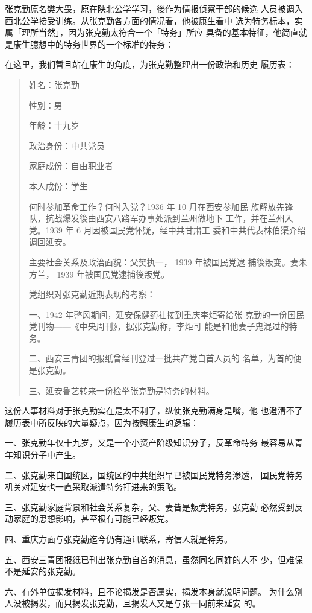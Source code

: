张克勤原名樊大畏，原在陕北公学学习，後作为情报侦察干部的候选
人员被调入西北公学接受训练。从张克勤各方面的情况看，他被康生看中
选为特务标本，实属「理所当然」，因为张克勤太符合一个「特务」所应
具备的基本特征，他简直就是康生臆想中的特务世界的一个标准的特务：
 
在这里，我们暂且站在康生的角度，为张克勤整理出一份政治和历史
履历表：
\begin{quote}
	
{\fzwkai 姓名：张克勤

性别：男

年龄：十九岁

政治身份：中共党员


家庭成份：自由职业者

本人成份：学生

何时参加革命工作？何时入党？1936 年 10 月在西安参加民
族解放先锋队，抗战爆发後由西安八路军办事处派到兰州做地下
工作，并在兰州入党。1939 年 6 月因被国民党怀疑，经中共甘肃工
委和中共代表林伯渠介绍调回延安。

主要社会关系及政治面貌：父樊执一， 1939 年被国民党逮
捕後叛变。妻朱方兰， 1939 年被国民党逮捕後叛党。

党组织对张克勤近期表现的考察：

一、1942 年整风期间，延安保健药社接到重庆李炬寄给张
克勤的一份国民党刊物——《中央周刊》，据张克勤称，李炬可
能是和他妻子鬼混过的特务。

二、西安三青团的报纸曾经刊登过一批共产党自首人员的
名单，为首的便是张克勤。

三、延安鲁艺转来一份检举张克勤是特务的材料。}
\end{quote}

这份人事材料对于张克勤实在是太不利了，纵使张克勤满身是嘴，他
也澄清不了履历表中所反映的大量疑点，因为按照康生的逻辑：

一、张克勤年仅十九岁，又是一个小资产阶级知识分子，反革命特务
最容易从青年知识分子中产生。

二、张克勤来自国统区，国统区的中共组织早已被国民党特务渗透，
国民党特务机关对延安也一直采取派遣特务打进来的策略。

三、张克勤家庭背景和社会关系复杂，父、妻皆是叛党特务，张克勤
必然受到反动家庭的思想影响，甚至极有可能已经叛党。

四、重庆方面与张克勤迄今仍有通讯联系，寄信人就是特务。

五、西安三青团报纸已刊出张克勤自首的消息，虽然同名同姓的人不
少，但难保不是延安的张克勤。

六、有外单位揭发材料，且不论揭发是否属实，揭发本身就说明问题。
为什么别人没被揭发，而只揭发张克勤，且揭发人又是与张一同前来延安
的。

